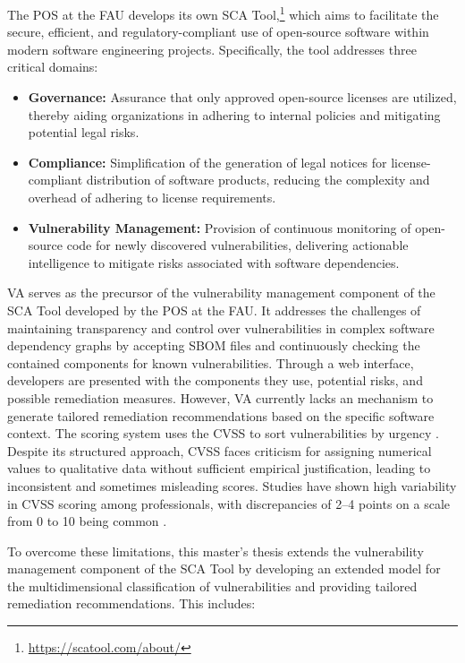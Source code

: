 The \ac{POS} at the \ac{FAU} develops its own \ac{SCA} Tool,\footnote{\url{https://scatool.com/about/}} which aims to facilitate the secure, efficient, and regulatory-compliant use of open-source software within modern software engineering projects. Specifically, the tool addresses three critical domains:

\begin{itemize}
    \item \textbf{Governance:} Assurance that only approved open-source licenses are utilized, thereby aiding organizations in adhering to internal policies and mitigating potential legal risks.
    \item \textbf{Compliance:} Simplification of the generation of legal notices for license-compliant distribution of software products, reducing the complexity and overhead of adhering to license requirements.
    \item \textbf{Vulnerability Management:} Provision of continuous monitoring of open-source code for newly discovered vulnerabilities, delivering actionable intelligence to mitigate risks associated with software dependencies.
\end{itemize}

\ac{VA} serves as the precursor of the vulnerability management component of the \ac{SCA} Tool developed by the \ac{POS} at the \ac{FAU}. It addresses the challenges of maintaining transparency and control over vulnerabilities in complex software dependency graphs by accepting \ac{SBOM} files and continuously checking the contained components for known vulnerabilities. Through a web interface, developers are presented with the components they use, potential risks, and possible remediation measures. However, \ac{VA} currently lacks an mechanism to generate tailored remediation recommendations based on the specific software context. The scoring system uses the \ac{CVSS} to sort vulnerabilities by urgency \autocite{nehrke_webdienst_2023}. Despite its structured approach, \ac{CVSS} faces criticism for assigning numerical values to qualitative data without sufficient empirical justification, leading to inconsistent and sometimes misleading scores. Studies have shown high variability in \ac{CVSS} scoring among professionals, with discrepancies of 2--4 points on a scale from 0 to 10 being common \autocite{spring_time_2021}.

To overcome these limitations, this master's thesis extends the vulnerability management component of the \ac{SCA} Tool by developing an extended model for the multidimensional classification of vulnerabilities and providing tailored remediation recommendations. This includes:

